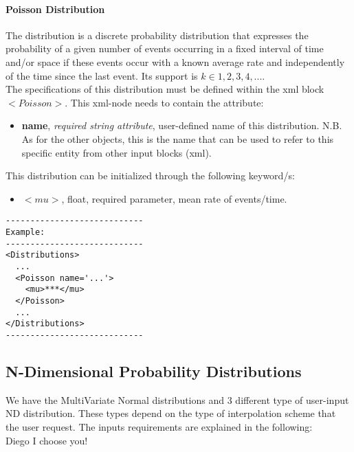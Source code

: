 \paragraph{Poisson Distribution}
\label{Poisson}
The  distribution is a discrete probability distribution that expresses the probability of a given number of events occurring in a fixed interval of time and/or space if these events occur with a known average rate and independently of the time since the last event. Its support is $k \in {1, 2, 3, 4, ...}$.
\\ The specifications of this distribution must be defined within the xml block $<Poisson>$. This xml-node needs to contain the attribute:
\vspace{-5mm}
\begin{itemize}
\itemsep0em
\item \textbf{name}, \textit{required string attribute}, user-defined name of this distribution. N.B. As for the other objects, this is the name that can be used to refer to this specific entity from other input blocks (xml).   
\end{itemize}
\vspace{-5mm}
This distribution can be initialized through the following keyword/s:
\begin{itemize}
\item $<mu>$, float, required parameter, mean rate of events/time.
\end{itemize}

\begin{lstlisting}[style=XML]
----------------------------
Example:
----------------------------
<Distributions>
  ...
  <Poisson name='...'>
    <mu>***</mu>
  </Poisson>
  ...
</Distributions>
----------------------------
\end{lstlisting}

\subsection{N-Dimensional Probability Distributions}
\label{subsec:NdDist}
We have the MultiVariate Normal distributions and 3 different type of user-input ND distribution. These types depend on the type of interpolation scheme that the user request. The inputs requirements are explained in the following:
\\Diego I choose you!

